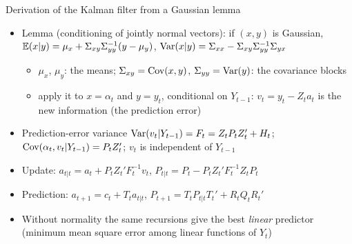 \begin{frame}{Derivation of the Kalman filter from a Gaussian lemma}
\itemsize{\small}
\begin{itemize}
    \item \hypertarget{kflemma}{}Lemma (conditioning of jointly normal vectors): if $(x, y)$ is Gaussian, $\mathbb{E}(x | y) = \mu_x + \Sigma_{xy}\Sigma_{yy}^{-1}(y - \mu_y)$, $\text{Var}(x | y) = \Sigma_{xx} - \Sigma_{xy}\Sigma_{yy}^{-1}\Sigma_{yx}$
    \begin{itemize}
        \item $\mu_x$, $\mu_y$: the means; $\Sigma_{xy} = \text{Cov}(x, y)$, $\Sigma_{yy} = \text{Var}(y)$: the covariance blocks
        \item apply it to $x = \alpha_t$ and $y = y_t$, conditional on $Y_{t-1}$: $v_t = y_t - Z_ta_t$ is the new information (the prediction error)
    \end{itemize}
    \item Prediction-error variance $\text{Var}(v_t | Y_{t-1}) = F_t = Z_tP_tZ_t' + H_t$; $\text{Cov}(\alpha_t, v_t | Y_{t-1}) = P_tZ_t'$; $v_t$ is independent of $Y_{t-1}$
    \item Update: $a_{t|t} = a_t + P_tZ_t'F_t^{-1}v_t$, $P_{t|t} = P_t - P_tZ_t'F_t^{-1}Z_tP_t$
    \item Prediction: $a_{t+1} = c_t + T_ta_{t|t}$, $P_{t+1} = T_tP_{t|t}T_t' + R_tQ_tR_t'$
    \item Without normality the same recursions give the best \emph{linear} predictor (minimum mean square error among linear functions of $Y_t$)
\end{itemize}
\end{frame}

